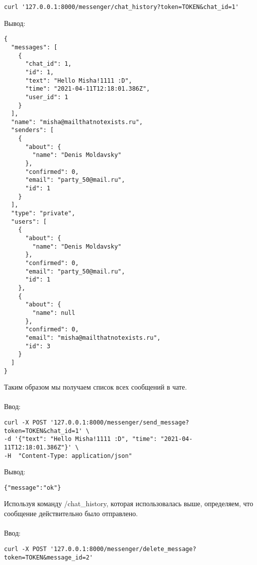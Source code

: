 \documentclass[testmethods]{espd}
\begin{document}
\begin{verbatim}
curl '127.0.0.1:8000/messenger/chat_history?token=TOKEN&chat_id=1'
\end{verbatim}

Вывод:

\begin{verbatim}
{
  "messages": [
    {
      "chat_id": 1,
      "id": 1,
      "text": "Hello Misha!1111 :D",
      "time": "2021-04-11T12:18:01.386Z",
      "user_id": 1
    }
  ],
  "name": "misha@mailthatnotexists.ru",
  "senders": [
    {
      "about": {
        "name": "Denis Moldavsky"
      },
      "confirmed": 0,
      "email": "party_50@mail.ru",
      "id": 1
    }
  ],
  "type": "private",
  "users": [
    {
      "about": {
        "name": "Denis Moldavsky"
      },
      "confirmed": 0,
      "email": "party_50@mail.ru",
      "id": 1
    },
    {
      "about": {
        "name": null
      },
      "confirmed": 0,
      "email": "misha@mailthatnotexists.ru",
      "id": 3
    }
  ]
}
\end{verbatim}

Таким образом мы получаем список всех сообщений в чате.

\paragraph{} %
Ввод:

\begin{verbatim}
curl -X POST '127.0.0.1:8000/messenger/send_message?token=TOKEN&chat_id=1' \
-d '{"text": "Hello Misha!1111 :D", "time": "2021-04-11T12:18:01.386Z"}' \
-H  "Content-Type: application/json"
\end{verbatim}

Вывод:

\begin{verbatim}
{"message":"ok"}
\end{verbatim}

Используя команду /chat\_history, которая использовалась выше, определяем, что сообщение действительно было отправлено.

\paragraph{} %
Ввод:

\begin{verbatim}
curl -X POST '127.0.0.1:8000/messenger/delete_message?token=TOKEN&message_id=2'
\end{verbatim}
\end{document}
